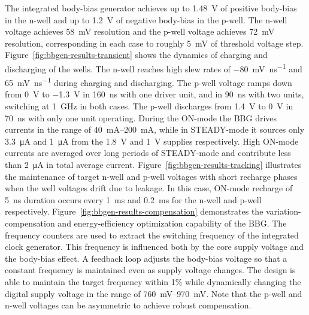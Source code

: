 \documentclass[graybox]{svmult}
\begin{document}
The integrated body-bias generator achieves up to \SI{1.48}{\volt} of positive body-bias in the n-well and up to \SI{1.2}{\volt} of negative body-bias in the p-well.
The n-well voltage achieves \SI{58}{\milli\volt} resolution and the p-well voltage achieves \SI{72}{\milli\volt} resolution, corresponding in each case to roughly \SI{5}{\milli\volt} of threshold voltage step.
Figure~\ref{fig:bbgen-results-transient} shows the dynamics of charging and discharging of the wells.
The n-well reaches high slew rates of \SI{-80}{\milli\volt\per\nano\second} and \SI[retain-explicit-plus]{+65}{\milli\volt\per\nano\second} during charging and discharging.
The p-well voltage ramps down from \SI{0}{\volt} to \SI{-1.3}{\volt} in \SI{160}{\nano\second} with one driver unit, and in \SI{90}{\nano\second} with two units, switching at \SI{1}{\giga\hertz} in both cases.
The p-well discharges from \SI{1.4}{\volt} to \SI{0}{\volt} in \SI{70}{\nano\second} with only one unit operating.
During the ON-mode the BBG drives currents in the range of \SIrange[range-phrase = --]{40}{200}{\milli\ampere}, while in STEADY-mode it sources only \SI{3.3}{\micro\ampere} and \SI{1}{\micro\ampere} from the \SI{1.8}{\volt} and \SI{1}{\volt} supplies respectively.
High ON-mode currents are averaged over long periods of STEADY-mode and contribute less than \SI{2}{\micro\ampere} in total average current.
Figure~\ref{fig:bbgen-results-tracking} illustrates the maintenance of target n-well and p-well voltages with short recharge phases when the well voltages drift due to leakage.
In this case, ON-mode recharge of \SI{5}{\nano\second} duration occurs every \SI{1}{\milli\second} and \SI{0.2}{\milli\second} for the n-well and p-well respectively.
Figure~\ref{fig:bbgen-results-compensation} demonstrates the variation-compensation and energy-efficiency optimization capability of the BBG.
The frequency counters are used to extract the switching frequency of the integrated clock generator.
This frequency is influenced both by the core supply voltage and the body-bias effect.
A feedback loop adjusts the body-bias voltage so that a constant frequency is maintained even as supply voltage changes.
The design is able to maintain the target frequency within 1\% while dynamically changing the digital supply voltage in the range of \SIrange[range-phrase = --]{760}{970}{\milli\volt}.
Note that the p-well and n-well voltages can be asymmetric to achieve robust compensation.
\end{document}
